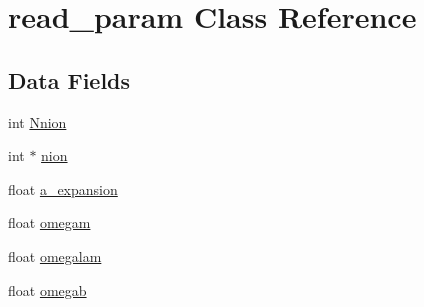 \hypertarget{classread__param}{\section{read\+\_\+param Class Reference}
\label{classread__param}
}
\subsection*{Data Fields}
\begin{DoxyCompactItemize}
\item 
int \hyperlink{classread__param_ab6d8d0b2c7ee385271e90e51818623bc}{Nnion}
\item 
int $\ast$ \hyperlink{classread__param_afaa56aa1d8568629cd222be6cce900b7}{nion}
\item 
float \hyperlink{classread__param_ab8ae1614d88a1fdcded37c8573053e9c}{a\+\_\+expansion}
\item 
float \hyperlink{classread__param_a1143ccc333b13b81d68f112fc1122acd}{omegam}
\item 
float \hyperlink{classread__param_ac99cfe381d57df39c2cdb6d5c8f6f548}{omegalam}
\item 
float \hyperlink{classread__param_aeaccd726adbb20f37e40458f9fc1789c}{omegab}
\end{DoxyCompactItemize}


